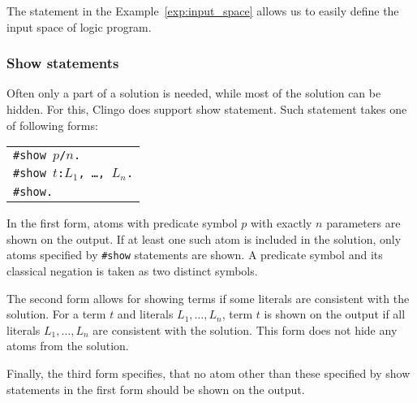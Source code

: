 The statement in the Example~\ref{exp:input_space} allows us to easily define the input space
of logic program.

\subsubsection{Show statements}

Often only a part of a solution is needed, while most of the solution can be hidden.
For this, Clingo does support show statement. Such statement takes one of following forms:
\begin{center}
    \begin{tabular}{l}
        \texttt{\#show $p$/$n$.}\\
        \texttt{\#show $t$:$L_1$, \ldots, $L_n$.}\\
        \texttt{\#show.}
    \end{tabular}
\end{center}

In the first form, atoms with predicate symbol $p$ with exactly $n$ parameters
are shown on the output. If at least one such atom is included in the solution,
only atoms specified by \texttt{\#show} statements are shown.
A predicate symbol and its classical negation is taken as two distinct symbols.

The second form allows for showing terms if some literals are consistent with the solution.
For a term $t$ and literals $L_1, \ldots, L_n$, term $t$ is shown on the output
if all literals $L_1, \ldots, L_n$ are consistent with the solution.
This form does not hide any atoms from the solution.

Finally, the third form specifies, that no atom other than these specified by
show statements in the first form should be shown on the output.
